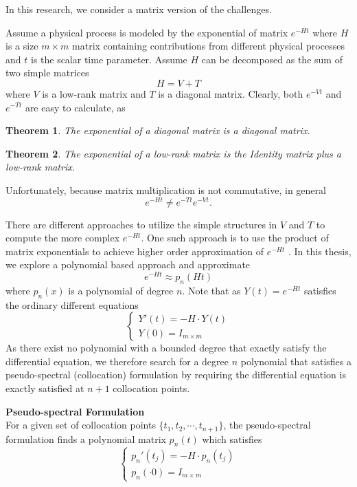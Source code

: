 \documentclass[12pt]{article}
\newtheorem{theorem}{Theorem}
\begin{document}
In this research, we consider a matrix version of the challenges.

Assume a physical process is modeled by the exponential of matrix $e^{-Ht}$ where $H$
is a size $m \times m$ matrix containing contributions from different physical processes 
and $t$ is the scalar time parameter. Assume $H$ can be decomposed as the sum of 
two simple matrices
$$H=V+T$$ where $V$ is a low-rank matrix and $T$ is a diagonal matrix.
Clearly, both $e^{-Vt}$ and $e^{-Tt}$ are easy to calculate, as 
\begin{theorem}
	The exponential of a diagonal matrix is a diagonal matrix.
\end{theorem}

\begin{theorem}
	The exponential of a low-rank matrix is the Identity matrix plus a low-rank matrix.
\end{theorem}

Unfortunately, because matrix multiplication is not commutative, in general
$$e^{-Ht} \neq e^{-Tt}e^{-Vt}.$$

There are different approaches to utilize the simple structures in $V$ and $T$ to compute the more complex
$e^{-Ht}$. One such approach is to use the product of matrix exponentials to achieve higher order approximation
of $e^{-Ht}$ \cite{}. In this thesis, we explore a polynomial based approach and approximate
$$e^{-Ht} \approx p_n(Ht)$$ 
where $p_n(x)$ is a polynomial of degree $n$. Note that as $Y(t)=e^{-Ht}$ satisfies the
ordinary different equations
\begin{equation}
	\left\{
		\begin{array}{l}
			Y'(t)= - H \cdot Y(t) \\
			Y(0) = I_{m\times m}
		\end{array}
	\right.
\end{equation}
As there exist no polynomial with a bounded degree that exactly satisfy the 
differential equation, we therefore search for a degree $n$ polynomial that
satisfies a pseudo-spectral (collocation) formulation by requiring the 
differential equation is exactly satisfied at $n+1$ collocation points.

{\noindent \bf Pseudo-spectral Formulation} \\
For a given set of collocation points $\{ t_1, t_2, \cdots, t_{n+1}\}$, 
the pseudo-spectral formulation finds a polynomial matrix $p_n(t)$ 
which satisfies
\begin{equation}
	\left\{
		\begin{array}{l}
			p_n'(t_j)=-H \cdot p_n(t_j) \\
			p_n(\cdot 0) = I_{m\times m}
		\end{array}
	\right.
\end{equation}
\end{document}
